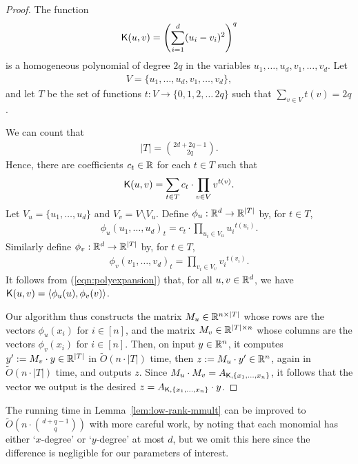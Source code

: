 \begin{proof}
The function 
\begin{align*}
\mathsf{K}(u,v) = \left( \sum_{i=1}^d ( u_i - v_i )^2 \right)^q
\end{align*}
is a homogeneous polynomial of degree $2q$ in the variables $u_1, \ldots, u_d, v_1, \ldots, v_d$. Let 
\begin{align*}
V = \{u_1, \ldots, u_d, v_1, \ldots, v_d\},
\end{align*}
and let $T$ be the set of functions $t : V \to \{0,1,2,\ldots\, 2q\}$  such that $\sum_{v \in V} t(v) = 2q$. 

We can count that 
\begin{align*}
|T| = \binom{2d+2q-1}{2q}.
\end{align*}
Hence, there are coefficients $c_t \in {\mathbb R}$ for each $t \in T$ such that
\begin{align} \label{eqn:polyexpansion}\mathsf{K}(u,v) = \sum_{t \in T} c_t \cdot \prod_{v \in V} v^{t(v)}.\end{align}
Let $V_u = \{u_1, \ldots, u_d\}$ and $V_v = V \setminus V_u$. Define $\phi_u : {\mathbb R}^d \to {\mathbb R}^{|T|}$ by, for $t \in T$, 
\begin{align*}
\phi_u(u_1, \ldots, u_d)_t = c_t \cdot \prod_{u_i \in V_u} {u_i}^{t(u_i)}.
\end{align*}
Similarly define $\phi_v : {\mathbb R}^d \to {\mathbb R}^{|T|}$ by, for $t \in T$, 
\begin{align*}
\phi_v(v_1, \ldots, v_d)_t = \prod_{v_i \in V_v} {v_i}^{t(v_i)}.
\end{align*}
It follows from (\ref{eqn:polyexpansion}) that, for all $u,v \in {\mathbb R}^d$, we have $\mathsf{K}(u,v) = \langle \phi_u(u), \phi_v(v) \rangle$.

Our algorithm thus constructs the matrix $M_u \in {\mathbb R}^{n \times |T|}$ whose rows are the vectors $\phi_u(x_i)$ for $i \in [n]$, and the matrix $M_v \in {\mathbb R}^{|T| \times n}$ whose columns are the vectors $\phi_v(x_i)$ for $i \in [n]$. Then, on input $y \in {\mathbb R}^n$, it computes $y' := M_v \cdot y \in {\mathbb R}^{|T|}$ in $\tilde{O}(n \cdot |T|)$ time, then $z := M_u \cdot y' \in {\mathbb R}^n$, again in $\tilde{O}(n \cdot |T|)$ time, and outputs $z$. Since $M_u \cdot M_v = A_{\mathsf{K},\{x_1, \ldots, x_n\}}$, it follows that the vector we output is the desired $z = A_{\mathsf{K},\{x_1, \ldots, x_n\}} \cdot y$.
\end{proof}

\begin{remark}
The running time in Lemma~\ref{lem:low-rank-mmult} can be improved to $\tilde{O}( n \cdot \binom{d+q-1}{q} )$ with more careful work, by noting that each monomial has either `$x$-degree' or `$y$-degree' at most $d$, but we omit this here since the difference is negligible for our parameters of interest.
\end{remark}

